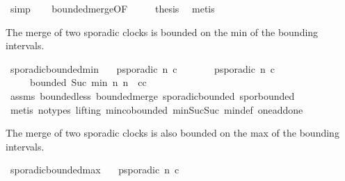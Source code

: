 \begin{isabellebody}
\ simp\isanewline
\ \ \isamarkupfalse%
\ bounded{\isacharunderscore}merge{\isacharbrackleft}OF\ {}\ {}\ {}{\isacharbrackright}\ \isamarkupfalse%
\ {\isacharquery}thesis\ \isamarkupfalse%
\ metis\isanewline
{}\isamarkupfalse%
%
\endisatagproof
{\isafoldproof}%
%
\isadelimproof
%
\endisadelimproof
%
\isadelimdocument
%
\endisadelimdocument
%
\isatagdocument
%
\isamarkuptrue%
%
\endisatagdocument
{\isafolddocument}%
%
\isadelimdocument
%
\endisadelimdocument
%
\begin{isamarkuptext}%
The merge of two sporadic clocks is bounded on the min of the bounding intervals.%
\end{isamarkuptext}\isamarkuptrue%
\isamarkupfalse%
\ sporadic{\isacharunderscore}bounded{\isacharunderscore}min{\isacharcolon}\isanewline
\ \ \ {\isacartoucheopen}p{\isacharunderscore}sporadic\ n\ c{\isacartoucheclose}\isanewline
\ \ \ \ \ \ \ {\isacartoucheopen}p{\isacharunderscore}sporadic\ n{\isacharprime}\ c{\isacharprime}{\isacartoucheclose}\isanewline
\ \ \ \ \ {\isacartoucheopen}bounded\ {\isacharparenleft}Suc\ {\isacharparenleft}min\ n\ n{\isacharprime}{\isacharparenright}{\isacharparenright}\ {}\ {\isacharparenleft}c{\isasymoplus}c{\isacharprime}{\isacharparenright}{\isacartoucheclose}\isanewline
%
\isadelimproof
%
\endisadelimproof
%
\isatagproof
{}\isamarkupfalse%
\ assms\ bounded{\isacharunderscore}less\ bounded{\isacharunderscore}merge\ sporadic{\isacharunderscore}bounded{}\ spor{\isacharunderscore}bounded\isanewline
{}\isamarkupfalse%
\ {\isacharparenleft}metis\ {\isacharparenleft}no{\isacharunderscore}types{\isacharcomma}\ lifting{\isacharparenright}\ min{\isachardot}cobounded{}\ min{\isacharunderscore}Suc{\isacharunderscore}Suc\ min{\isacharunderscore}def\ one{\isacharunderscore}add{\isacharunderscore}one{\isacharparenright}%
\endisatagproof
{\isafoldproof}%
%
\isadelimproof
%
\endisadelimproof
%
\begin{isamarkuptext}%
The merge of two sporadic clocks is also bounded on the max of the bounding intervals.%
\end{isamarkuptext}\isamarkuptrue%
\isamarkupfalse%
\ sporadic{\isacharunderscore}bounded{\isacharunderscore}max{\isacharcolon}\isanewline
\ \ \ {\isacartoucheopen}p{\isacharunderscore}sporadic\ n\ c{\isacartoucheclose}\isanewline

\end{isabellebody}
